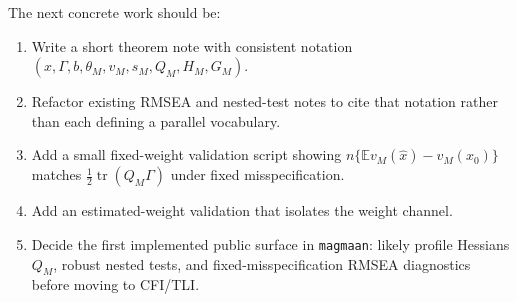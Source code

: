 \documentclass[11pt]{article}
\newcommand{\E}{\mathbb{E}}
\newcommand{\tr}{\operatorname{tr}}
\theoremstyle{plain}
\theoremstyle{remark}
\begin{document}
The next concrete work should be:
\begin{enumerate}
\item Write a short theorem note with consistent notation
  $(x,\Gamma,b,\theta_M,v_M,s_M,Q_M,H_M,G_M)$.
\item Refactor existing RMSEA and nested-test notes to cite that notation
  rather than each defining a parallel vocabulary.
\item Add a small fixed-weight validation script showing
  $n\{\E v_M(\hat x)-v_M(x_0)\}$ matches $\tfrac12\tr(Q_M\Gamma)$ under fixed
  misspecification.
\item Add an estimated-weight validation that isolates the weight channel.
\item Decide the first implemented public surface in \texttt{magmaan}: likely
  profile Hessians $Q_M$, robust nested tests, and fixed-misspecification RMSEA
  diagnostics before moving to CFI/TLI.
\end{enumerate}
\end{document}
